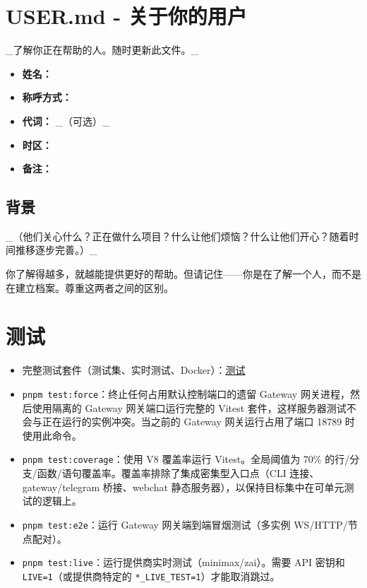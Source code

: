 \clearpage

\section{USER.md - 关于你的用户}


\_了解你正在帮助的人。随时更新此文件。\_

\begin{itemize}
  \item \textbf{姓名：}
  \item \textbf{称呼方式：}
  \item \textbf{代词：} \_（可选）\_
  \item \textbf{时区：}
  \item \textbf{备注：}
\end{itemize}


\subsection{背景}


\_（他们关心什么？正在做什么项目？什么让他们烦恼？什么让他们开心？随着时间推移逐步完善。）\_

\hrulefill


你了解得越多，就越能提供更好的帮助。但请记住——你是在了解一个人，而不是在建立档案。尊重这两者之间的区别。


\clearpage

\section{测试}


\begin{itemize}
  \item 完整测试套件（测试集、实时测试、Docker）：\href{/help/testing}{测试}
\end{itemize}


\begin{itemize}
  \item \texttt{pnpm test:force}：终止任何占用默认控制端口的遗留 Gateway 网关进程，然后使用隔离的 Gateway 网关端口运行完整的 Vitest 套件，这样服务器测试不会与正在运行的实例冲突。当之前的 Gateway 网关运行占用了端口 18789 时使用此命令。
  \item \texttt{pnpm test:coverage}：使用 V8 覆盖率运行 Vitest。全局阈值为 70\% 的行/分支/函数/语句覆盖率。覆盖率排除了集成密集型入口点（CLI 连接、gateway/telegram 桥接、webchat 静态服务器），以保持目标集中在可单元测试的逻辑上。
  \item \texttt{pnpm test:e2e}：运行 Gateway 网关端到端冒烟测试（多实例 WS/HTTP/节点配对）。
  \item \texttt{pnpm test:live}：运行提供商实时测试（minimax/zai）。需要 API 密钥和 \texttt{LIVE=1}（或提供商特定的 \texttt{*\_LIVE\_TEST=1}）才能取消跳过。
\end{itemize}


